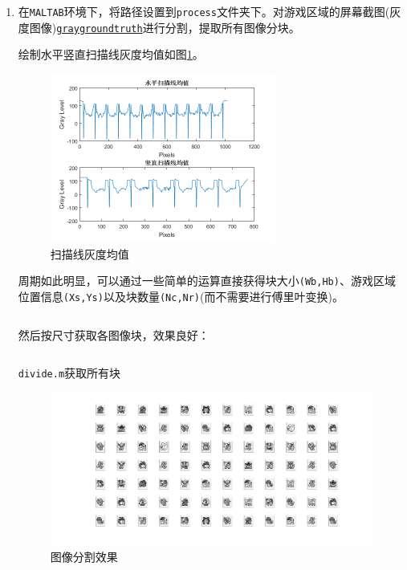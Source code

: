 \documentclass{article}
\numberwithin{figure}{section}
\numberwithin{table}{section}
\numberwithin{listing}{section}
\numberwithin{equation}{section}
\begin{document}
        \begin{enumerate}
            \item 在\texttt{MALTAB}环境下，将路径设置到\texttt{process}文件夹下。对游戏区域的屏幕截图(灰度图像)\href{../process/graygroundtruth.jpg}{\texttt{graygroundtruth}}进行分割，提取所有图像分块。

                绘制水平竖直扫描线灰度均值如图\ref{fig:gray_mean}。

                \begin{figure}[H]
                    \centering
                    \includegraphics[width=0.7\textwidth]{gray_mean}
                    \caption{扫描线灰度均值}
                    \label{fig:gray_mean}
                \end{figure}

                周期如此明显，可以通过一些简单的运算直接获得块大小\texttt{(Wb,Hb)}、游戏区域位置信息\texttt{(Xs,Ys)}以及块数量\texttt{(Nc,Nr)}(而不需要进行傅里叶变换)。

                \inputminted[firstline=7,lastline=33]{matlab}{../process/divide.m}
                \begingroup
                \endgroup

                然后按尺寸获取各图像块，效果良好：

                \begin{listing}[H]
                    \inputminted[firstline=36,lastline=46]{matlab}{../process/divide.m}
                    \caption{\texttt{divide.m}获取所有块}
                \end{listing}

                \begin{figure}[H]
                    \centering
                    \includegraphics[width=\textwidth]{all_blocks}
                    \caption{图像分割效果}
                \end{figure}


        \end{enumerate}
    
\end{document}
